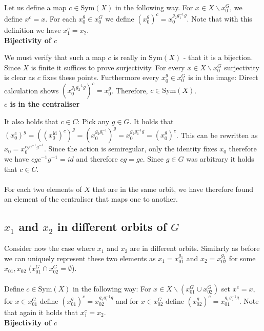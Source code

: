\documentclass{article}
\begin{document}
\noindent Let us define a map $c \in \mathrm{Sym}\left(X\right)$ in the following way. For $x \in X \backslash x_0^G$, we define $x^c = x$. 
For each $x_0^g \in x_0^G$ we define $\left(x_0^g\right)^c = x_0^{g_2 g_1^{-1} g}$. Note that with this definition we have $x_1^c = x_2$.
\\
\noindent\textbf{Bijectivity of $c$}

\noindent
We must verify that such a map $c$ is really in $\mathrm{Sym}\left(X\right)$ - that it is a bijection. Since $X$ is finite it suffices to prove surjectivity. For every $x \in X \backslash x_0^G$ surjectivity is clear as $c$ fixes these points. Furthermore every $x_0^g \in x_0^G$ is in the image: Direct calculation shows $\left(x_0^{g_1 g_2^{-1} g}\right)^c = x_0^g$. Therefore, $c \in \mathrm{Sym}\left(X\right)$. 
\\
\noindent\textbf{$c$ is in the centraliser}

\noindent
It also holds that $c \in C$: Pick any $g \in G$. It holds that $\left(x_0^c\right)^g = \left(\left(x_0^\mathrm{id}\right)^c\right)^g = \left(x_0^{g_2 g_1^{-1}}\right)^g = x_0^{g_2 g_1^{-1} g} = \left(x_0^g\right)^c$. This can be rewritten as $x_0 = x_0^{cg c^{-1} g^{-1}}$. Since the action is semiregular, only the identity fixes $x_0$ therefore we have $c g c^{-1} g^{-1} = id$ and therefore $c g = gc$. Since $g \in G$ was arbitrary it holds that $c \in C$. 
\\
\\
\noindent
For each two elements of $X$ that are in the same orbit, we have therefore found an element of the centraliser that maps one to another.

\subsection*{$x_1$ and $x_2$ in different orbits of $G$}
Consider now the case where $x_1$ and $x_2$ are in different orbits. Similarly as before we can uniquely represent these two elements as $x_1 = x_{01}^{g_1}$ and $x_2 = x_{02}^{g_2}$ for some $x_{01}, x_{02}$ ($x_{01}^G \cap x_{02}^G = \emptyset$). 
\\
\\
\noindent Define $c \in \mathrm{Sym}\left(X\right)$ in the following way: For $x \in X \backslash \left(x_{01}^G \cup x_{02}^G\right)$ set $x^c = x$, for $x \in x_{01}^G$ define $\left(x_{01}^g\right)^c = x_{02}^{g_2 g_1^{-1} g}$ and for $x \in x_{02}^G$ define $\left(x_{02}^g\right)^c = x_{01}^{g_1 g_2^{-1} g}$. Note that again it holds that $x_1^c = x_2$.
\\
\noindent\textbf{Bijectivity of $c$}
\end{document}
